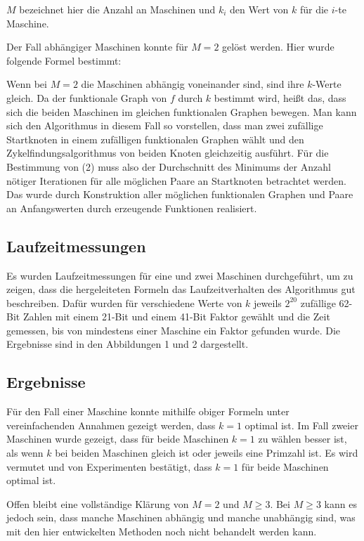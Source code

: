 \documentclass[a4paper, extrafontsizes, ngerman, 25pt]{memoir}
\begin{document}
\noindent $M$ bezeichnet hier die Anzahl an Maschinen und $k_i$ den Wert von $k$ für die $i$-te Maschine.

Der Fall abhängiger Maschinen konnte für $M = 2$ gelöst werden. Hier wurde folgende Formel bestimmt:

\begin{figure}[H]
    \hspace{2.8cm}
    
\end{figure}

\noindent Wenn bei $M = 2$ die Maschinen abhängig voneinander sind, sind ihre $k$-Werte gleich. Da der funktionale Graph von $f$ durch $k$ bestimmt wird, heißt das, dass sich die beiden Maschinen im gleichen funktionalen Graphen bewegen. Man kann sich den Algorithmus in diesem Fall so vorstellen, dass man zwei zufällige Startknoten in einem zufälligen funktionalen Graphen wählt und den Zykelfindungsalgorithmus von beiden Knoten gleichzeitig ausführt. Für die Bestimmung von (2) muss also der Durchschnitt des Minimums der Anzahl nötiger Iterationen für alle möglichen Paare an Startknoten betrachtet werden. Das wurde durch Konstruktion aller möglichen funktionalen Graphen und Paare an Anfangswerten durch erzeugende Funktionen realisiert.

\newpage

\subsection{Laufzeitmessungen} Es wurden Laufzeitmessungen für eine und zwei Maschinen durchgeführt, um zu zeigen, dass die hergeleiteten Formeln das Laufzeitverhalten des Algorithmus gut beschreiben. Dafür wurden für verschiedene Werte von $k$ jeweils $2^{20}$ zufällige 62-Bit Zahlen mit einem 21-Bit und einem 41-Bit Faktor gewählt und die Zeit gemessen, bis von mindestens einer Maschine ein Faktor gefunden wurde. Die Ergebnisse sind in den Abbildungen 1 und 2 dargestellt.

\subsection{Ergebnisse}

Für den Fall einer Maschine konnte mithilfe obiger Formeln unter vereinfachenden Annahmen gezeigt werden, dass $k = 1$ optimal ist. Im Fall zweier Maschinen wurde gezeigt, dass für beide Maschinen $k = 1$ zu wählen besser ist, als wenn $k$ bei beiden Maschinen gleich ist oder jeweils eine Primzahl ist. Es wird vermutet und von Experimenten bestätigt, dass $k = 1$ für beide Maschinen optimal ist.

Offen bleibt eine vollständige Klärung von $M = 2$ und $M \ge 3$. Bei $M \ge 3$ kann es jedoch sein, dass manche Maschinen abhängig und manche unabhängig sind, was mit den hier entwickelten Methoden noch nicht behandelt werden kann.
\end{document}
